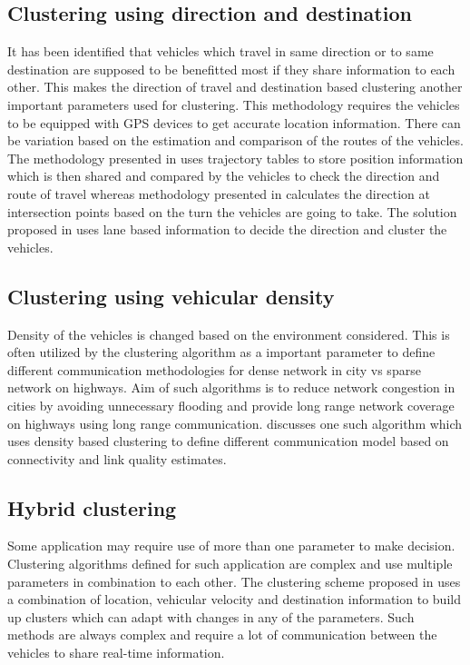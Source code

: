 \documentclass[]{ccs-thesis}
\begin{document}
\subsection{Clustering using direction and destination}

It has been identified that vehicles which travel in same direction or to same destination are supposed to be benefitted
most if they share information to each other. This makes the direction of travel and destination based clustering another
important parameters used for clustering. This methodology requires the vehicles to be equipped with \ac{GPS} devices to
get accurate location information. There can be variation based on the estimation and comparison of the routes of the
vehicles. The methodology presented in \cite{6685518} uses trajectory tables to store position information which is
then shared and compared by the vehicles to check the direction and route of travel whereas methodology presented
in \cite{5416361} calculates the direction at intersection points based on the turn the vehicles are going to take.
The solution proposed in \cite{5735785} uses lane based information to decide the direction and cluster the vehicles.

\subsection{Clustering using vehicular density}

Density of the vehicles is changed based on the environment considered. This is often utilized by the clustering
algorithm as a important parameter to define different communication methodologies for dense network in city vs
sparse network on highways. Aim of such algorithms is to reduce network congestion in cities by avoiding unnecessary
flooding and provide long range network coverage on highways using long range communication. \cite{4976256} discusses
one such algorithm which uses density based clustering to define different communication model based on connectivity and
link quality estimates.

\subsection{Hybrid clustering}

Some application may require use of more than one parameter to make decision. Clustering algorithms defined for such
application are complex and use multiple parameters in combination to each other. The clustering scheme proposed
in \cite{6077004} uses a combination of location, vehicular velocity and destination information to build up clusters
which can adapt with changes in any of the parameters. Such methods are always complex and require a lot of communication
between the vehicles to share real-time information.
\end{document}
